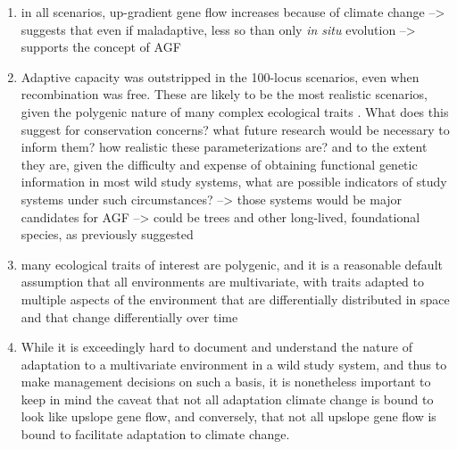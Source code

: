 \documentclass[9pt,twocolumn,twoside,lineno]{pnas-new}
\begin{document}
   \begin{enumerate}
        \item in all scenarios, up-gradient gene flow increases because of climate change --> suggests that even if maladaptive, less so than only \textit{in situ} evolution --> supports the concept of AGF
        \item Adaptive capacity was outstripped in the 100-locus scenarios, even when recombination was free. These are likely to be the most realistic scenarios, given the polygenic nature of many complex ecological traits \cite{barghi_polygenic}. What does this suggest for conservation concerns? what future research would be necessary to inform them? how realistic these parameterizations are? and to the extent they are, given the difficulty and expense of obtaining functional genetic information in most wild study systems, what are possible indicators of study systems under such circumstances? --> those systems would be major candidates for AGF --> could be trees and other long-lived, foundational species, as previously suggested \cite{aitken_whitlock, aitken_bemmels}
        \item many ecological traits of interest are polygenic, and it is a reasonable default assumption that all environments are multivariate, with traits adapted to multiple aspects of the environment that are differentially distributed in space and that change differentially over time
        \item While it is exceedingly hard to document and understand the nature of adaptation to a multivariate environment in a wild study system, and thus to make management decisions on such a basis, it is nonetheless important to keep in mind the caveat that not all adaptation climate change is bound to look like upslope gene flow, and conversely, that not all upslope gene flow is bound to facilitate adaptation to climate change.
    \end{enumerate}
\end{document}

